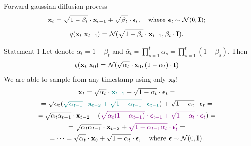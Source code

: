 \begin{frame}{Forward gaussian diffusion process}
	\[
		\mathbf{x}_t = \sqrt{1 - \beta_t} \cdot \mathbf{x}_{t - 1} + \sqrt{\beta_t} \cdot \boldsymbol{\epsilon}_t, \quad \text{where }\boldsymbol{\epsilon}_t \sim \mathcal{N}(0, \mathbf{I});
	\]
	\[
		q(\mathbf{x}_t | \mathbf{x}_{t-1}) = \mathcal{N}(\sqrt{1 - \beta_t} \cdot \mathbf{x}_{t-1}, \beta_t \cdot \mathbf{I}).
	\]
	\vspace{-0.5cm}
	\begin{block}{Statement 1}
		Let denote $\alpha_t = 1 - \beta_t$ and $\bar{\alpha}_t = \prod_{s=1}^t \alpha_s = \prod_{s=1}^t (1 - \beta_s)$. Then
		\[
			q(\mathbf{x}_t | \mathbf{x}_0) = \mathcal{N}(\sqrt{\bar{\alpha}_t} \cdot \mathbf{x}_0, (1 - \bar{\alpha}_t) \cdot \mathbf{I})
		\]
		We are able to sample from any timestamp using only $\mathbf{x}_0$!
		\vspace{-0.2cm}
		{\small
		\begin{multline*}
			\mathbf{x}_t = \sqrt{\alpha_t} \cdot {\color{teal}\mathbf{x}_{t-1}} + \sqrt{1 - \alpha_t} \cdot \boldsymbol{\epsilon}_t = \\
			= \sqrt{\alpha_t} ({\color{teal} \sqrt{\alpha_{t-1}} \cdot \mathbf{x}_{t-2} + \sqrt{1 - \alpha_{t-1}} \cdot  \boldsymbol{\epsilon}_{t-1}}) + \sqrt{1 - \alpha_t} \cdot \boldsymbol{\epsilon}_t = \\
			= \sqrt{\alpha_t \alpha_{t-1}} \cdot \mathbf{x}_{t-2} + ( {\color{violet}\sqrt{\alpha_t (1 - \alpha_{t-1})} \cdot  \boldsymbol{\epsilon}_{t-1} + \sqrt{1 - \alpha_t} \cdot \boldsymbol{\epsilon}_t}) = \\
			= \sqrt{\alpha_t \alpha_{t-1}} \cdot \mathbf{x}_{t-2} + {\color{violet}\sqrt{1 - \alpha_{t-1} \alpha_t} \cdot \boldsymbol{\epsilon}'_t} = \\
			 = \dots = \sqrt{\bar{\alpha}_t} \cdot \mathbf{x}_{0} + \sqrt{1 - \bar{\alpha}_t} \cdot \boldsymbol{\epsilon}, \quad \text{where } \boldsymbol{\epsilon} \sim \mathcal{N}(0, \mathbf{I}).
		\end{multline*}
		}
	\end{block}
 \end{frame}
